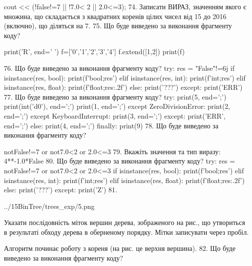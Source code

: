 \documentclass[11pt]{article}
\begin{document}
cout << (!false!=7 || !7.0< 2 || 2.0<=3);
\vspace{5mm}
74. 
Записати ВИРАЗ, значенням якого є множина, що складається з квадратних коренів цілих чисел від 15 до 2016 (включно), що діляться на 7.\vspace{5mm}
75. Що буде виведено за виконання фрагменту коду?

print('R', end=' ')
f=['0','1','2','3','4']
f.extend([1,2])
print(f)

\vspace{5mm}
76. Що буде виведено за виконання фрагменту коду?
try:
    res = "False"!=6j
    if isinstance(res, bool):
        print(f'bool;{res}')
    elif isinstance(res, int):
        print(f'int;{res}')
    elif isinstance(res, float):
        print(f'float;{res:.2f}')
    else:
        print('???')
except:
    print('ERR')
\vspace{5mm}
77. Що буде виведено за виконання фрагменту коду?
try:
    print(5, end=';')
    print(int('d0'), end=';')
    print(1, end=';')
except ZeroDivisionError:
    print(2, end=';')
except KeyboardInterrupt:
    print(3, end=';')
except:
    print('ERR', end=';')
else:
    print(4, end=';')
finally:
    print(9)
\vspace{5mm}
78. Що буде виведено за виконання фрагменту коду?

notFalse!=7 or not7.0<2 or 2.0<=3
\vspace{5mm}
79. 
Вкажіть значення та тип виразу:
4**-1.0*False
\vspace{5mm}
80. Що буде виведено за виконання фрагменту коду?
try:
    res = notFalse!=7 or not7.0<2 or 2.0<=3
    if isinstance(res, bool):
        print(f'bool;{res}')
    elif isinstance(res, int):
        print(f'int;{res}')
    elif isinstance(res, float):
        print(f'float;{res:.2f}')
    else:
        print('???')
except:
    print('Z')
\vspace{5mm}
81. 

\begin{center}
	{../15BinTree/trees_exp/5.png}
\end{center}
Указати послідовність міток вершин дерева, зображеного на рис., що утвориться в результаті обходу дерева в оберненому порядку. Мітки записувати через пробіл.\par Алгоритм починає роботу з кореня (на рис. це верхня вершина).
\vspace{5mm}
82. Що буде виведено за виконання фрагменту коду?
\end{document}
